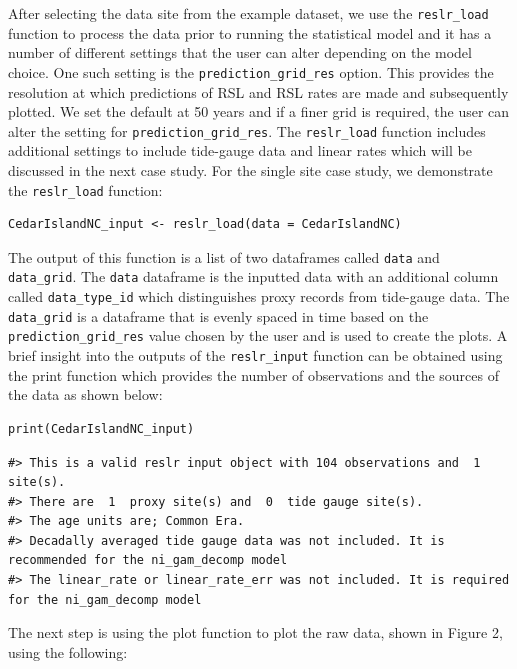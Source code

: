 After selecting the data site from the example dataset, we use the \texttt{reslr\_load} function to process the data prior to running the statistical model and it has a number of different settings that the user can alter depending on the model choice. One such setting is the \texttt{prediction\_grid\_res} option. This provides the resolution at which predictions of RSL and RSL rates are made and subsequently plotted. We set the default at 50 years and if a finer grid is required, the user can alter the setting for \texttt{prediction\_grid\_res}. The \texttt{reslr\_load} function includes additional settings to include tide-gauge data and linear rates which will be discussed in the next case study. For the single site case study, we demonstrate the \texttt{reslr\_load} function:
\scriptsize

\begin{verbatim}
CedarIslandNC_input <- reslr_load(data = CedarIslandNC)
\end{verbatim}

\normalsize

The output of this function is a list of two dataframes called \texttt{data} and \texttt{data\_grid}. The \texttt{data} dataframe is the inputted data with an additional column called \texttt{data\_type\_id} which distinguishes proxy records from tide-gauge data. The \texttt{data\_grid} is a dataframe that is evenly spaced in time based on the \texttt{prediction\_grid\_res} value chosen by the user and is used to create the plots. A brief insight into the outputs of the \texttt{reslr\_input} function can be obtained using the print function which provides the number of observations and the sources of the data as shown below:
\scriptsize

\begin{verbatim}
print(CedarIslandNC_input)
\end{verbatim}

\begin{verbatim}
#> This is a valid reslr input object with 104 observations and  1 site(s).
#> There are  1  proxy site(s) and  0  tide gauge site(s).
#> The age units are; Common Era. 
#> Decadally averaged tide gauge data was not included. It is recommended for the ni_gam_decomp model 
#> The linear_rate or linear_rate_err was not included. It is required for the ni_gam_decomp model
\end{verbatim}

\normalsize

The next step is using the plot function to plot the raw data, shown in Figure 2, using the following:
\scriptsize

